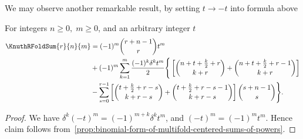 We may observe another remarkable result, by setting $t \rightarrow -t$
into formula above
\begin{proposition}
  \label{prop:negated-binomial-centered-sums-of-powers}
  For integers $n\geq 0, \; m \geq 0$, and an arbitrary integer $t$
  \begin{align*}
    \KnuthRFoldSum{r}{n}{m}
    &= (-1)^{m} \binom{r+n-1}{r} t^m \\
    &+ (-1)^{m}\sum_{k=1}^{m} \frac{(-1)^{k} \delta^{k} t^{m}}{2}
    \Bigg \{
      \left[
        \binom{n+t+\frac{k}{2}+r}{k+r}
        +
        \binom{n+t+\frac{k}{2}+r-1}{k+r}
      \right] \\
      &-
      \sum_{s=0}^{r-1}
      \left[
        \binom{t+\frac{k}{2} + r -s}{k+r-s} +
        \binom{t+\frac{k}{2} + r -s-1}{k+r-s}
      \right] \binom{s+n-1}{s}
    \Bigg \}.
  \end{align*}
  \begin{proof}
    We have $\delta^{k} (-t)^{m} = (-1)^{m+k} \delta^{k} t^{m}$,
    and $(-t)^{m} = (-1)^{m} t^{m}$.
    Hence claim follows
    from~\eqref{prop:binomial-form-of-multifold-centered-sums-of-powers}.
  \end{proof}
\end{proposition}
